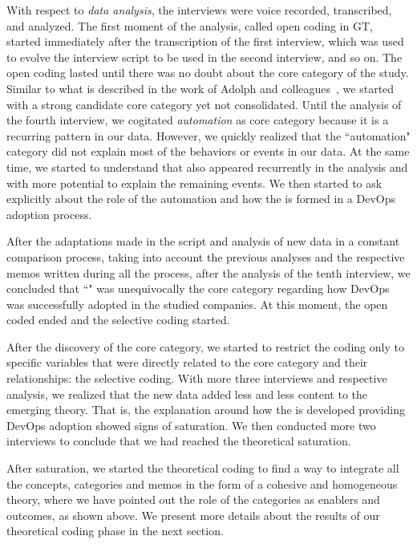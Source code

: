 With respect to \emph{data analysis}, the interviews were voice recorded, transcribed, and analyzed. The first moment
of the analysis, called open coding in GT, started immediately after the
transcription of the first interview, which
was used to evolve the interview script to be used in
the second interview, and so on. The open coding lasted until there was no
doubt about the core category of the study. Similar to what is described in
the work of Adolph and colleagues~\cite{adolph2012reconciling}, we started
with a strong candidate core category yet not consolidated. Until
the analysis of the fourth interview, we cogitated \emph{automation} as core
category because it is a recurring pattern in our data. However, we quickly
realized that the ``automation" category did not explain most of the behaviors
or events in our data. At the same time, we started to understand that
\cc also appeared recurrently in the analysis and with more
potential to explain the remaining events. We then started to ask explicitly
about the role of the automation and how the \cc is formed
in a DevOps adoption process.

After the adaptations made in the script and analysis of new data in a constant
comparison process, taking into account the previous analyses and the
respective memos written during all the process, after the analysis of the tenth
interview, we concluded that ``\cc" was unequivocally the core
category regarding how DevOps was successfully adopted in the studied companies.
At this moment, the open coded ended and the selective coding started.

After the discovery of the core category, we started to restrict the coding only
to specific variables that were directly related to the core category and their
relationships: the selective coding.
With more three interviews and respective analysis, we realized that
the new data added less and less content to the emerging theory. That is, the
explanation around how the \cc is developed providing
DevOps adoption showed signs of saturation. We then conducted more two
interviews to conclude that we had reached the theoretical saturation.

After saturation, we started the theoretical coding to find a way to integrate
all the concepts, categories and memos in the form of a cohesive and
homogeneous theory, where we have pointed out the role of the categories as
enablers and outcomes, as shown above. We present more details about
the results of our theoretical coding phase in the next section.

